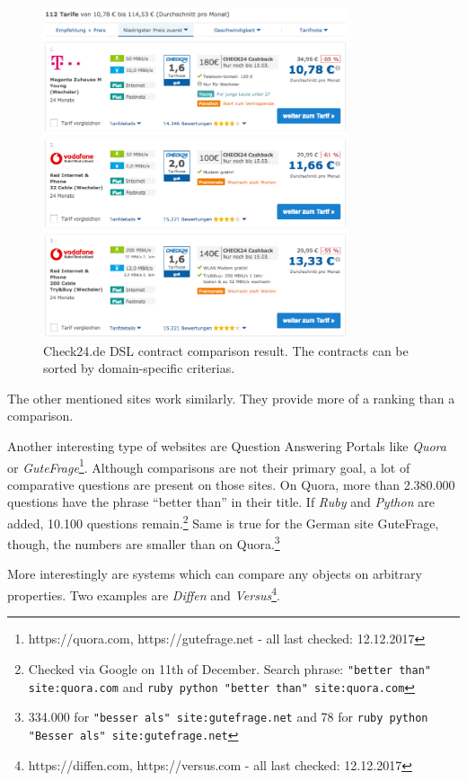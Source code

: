 \begin{figure}[h]
 \centering
	\includegraphics[width=0.8\textwidth,scale=0.8]{images/ds-sys/check24_2}
	\caption{Check24.de DSL contract comparison result. The contracts can be sorted by domain-specific criterias.}
	\label{img:check24_2}
\end{figure}

The other mentioned sites work similarly. They provide more of a ranking than a comparison.


Another interesting type of websites are Question Answering Portals like \emph{Quora} or \emph{GuteFrage}\footnote{https://quora.com, https://gutefrage.net - all last checked: 12.12.2017}. Although comparisons are not their primary goal, a lot of comparative questions are present on those sites.
On Quora, more than 2.380.000 questions have the phrase \enquote{better than} in their title. If \emph{Ruby} and \emph{Python} are added, 10.100 questions remain.\footnote{Checked via Google on 11th of December. Search phrase: \texttt{"better than" site:quora.com} and \texttt{ruby python "better than" site:quora.com}}
Same is true for the German site GuteFrage, though, the numbers are smaller than on Quora.\footnote{334.000 for \texttt{"besser als" site:gutefrage.net} and 78 for \texttt{ruby python "Besser als" site:gutefrage.net}}\newline

More interestingly are systems which can compare any objects on arbitrary properties. Two examples are \emph{Diffen} and \emph{Versus}\footnote{https://diffen.com, https://versus.com - all last checked: 12.12.2017}.

